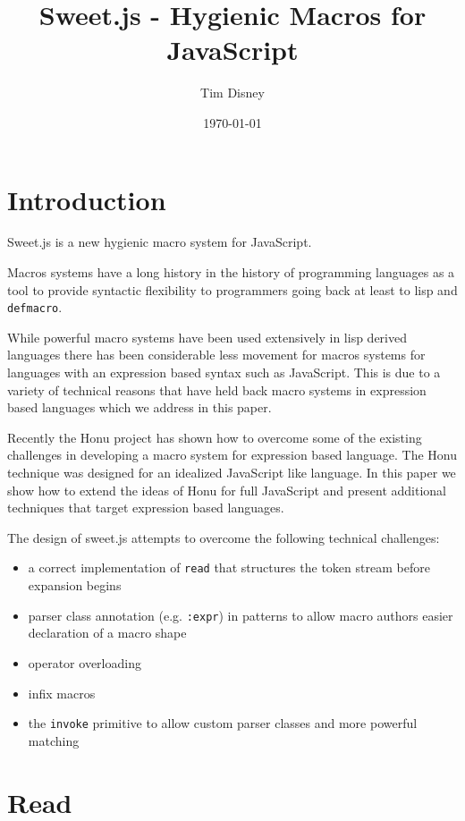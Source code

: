 \documentclass[preprint,10pt]{sigplanconf}
\author{Tim Disney}
\date{\today}
\title{Sweet.js - Hygienic Macros for JavaScript}
\begin{document}
\maketitle

\section{Introduction}
\label{sec-1}

Sweet.js is a new hygienic macro system for JavaScript.

Macros systems have a long history in the history of programming
languages as a tool to provide syntactic flexibility to programmers
going back at least to lisp and \texttt{defmacro}. 

While powerful macro systems have been used extensively in lisp
derived languages there has been considerable less movement for macros
systems for languages with an expression based syntax such as
JavaScript. This is due to a variety of technical reasons that have
held back macro systems in expression based languages which we address
in this paper.

Recently the Honu project has shown how to overcome some of the
existing challenges in developing a macro system for expression based
language. The Honu technique was designed for an idealized JavaScript
like language. In this paper we show how to extend the ideas of Honu
for full JavaScript and present additional techniques that target
expression based languages.

The design of sweet.js attempts to overcome the following technical
challenges: 

\begin{itemize}
\item a correct implementation of \texttt{read} that structures the token stream
before expansion begins
\item parser class annotation (e.g. \texttt{:expr}) in patterns to allow macro
authors easier declaration of a macro shape
\item operator overloading
\item infix macros
\item the \texttt{invoke} primitive to allow custom parser classes and more
powerful matching
\end{itemize}
\section{Read}
\label{sec-2}
\end{document}
